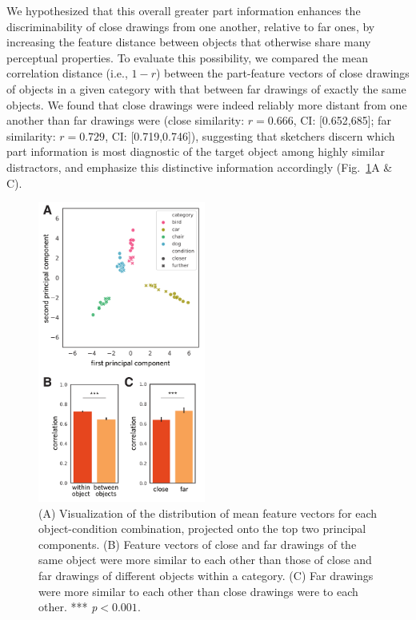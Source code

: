 \documentclass[10pt,letterpaper]{article}
\begin{document}
We hypothesized that this overall greater part information enhances the discriminability of close drawings from one another, relative to far ones, by increasing the feature distance between objects that otherwise share many perceptual properties. 
To evaluate this possibility, we compared the mean correlation distance (i.e., $1 - r$) between the part-feature vectors of close drawings of objects in a given category with that between far drawings of exactly the same objects. 
We found that close drawings were indeed reliably more distant from one another than far drawings were (close similarity: $r = 0.666$, CI: [0.652,685]; far similarity: $r = 0.729$, CI: [0.719,0.746]), suggesting that sketchers discern which part information is most diagnostic of the target object among highly similar distractors, and emphasize this distinctive information accordingly (Fig.~\ref{part_emphasis}A \& C).

\begin{figure}[htbp]
\centering
\includegraphics[width=0.49\textwidth]{figures/7_part_emphasis.pdf}
\caption{(A) Visualization of the distribution of mean feature vectors for each object-condition combination, projected onto the top two principal components. (B) Feature vectors of close and far drawings of the same object were more similar to each other than those of close and far drawings of different objects within a category. (C) Far drawings were more similar to each other than close drawings were to each other. *** \textit{p}$<0.001.$}
\label{part_emphasis}
\end{figure}
\end{document}
